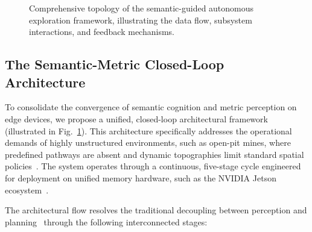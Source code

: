 \documentclass[conference]{IEEEtran}
\begin{document}
\begin{figure}[htbp]
	\caption{Comprehensive topology of the semantic-guided autonomous exploration framework, illustrating the data flow, subsystem interactions, and feedback mechanisms.}
	\label{fig:comprehensive_topology}
\end{figure}

\subsection{The Semantic-Metric Closed-Loop Architecture}
\label{subsec:closed_loop}

To consolidate the convergence of semantic cognition and metric perception on edge devices, we propose a unified, closed-loop architectural framework (illustrated in Fig.~\ref{fig:comprehensive_topology}). This architecture specifically addresses the operational demands of highly unstructured environments, such as open-pit mines, where predefined pathways are absent and dynamic topographies limit standard spatial policies~\cite{wang2022terrain}. The system operates through a continuous, five-stage cycle engineered for deployment on unified memory hardware, such as the NVIDIA Jetson ecosystem~\cite{bvm2024jetson, edge_opt2024}.

The architectural flow resolves the traditional decoupling between perception and planning~\cite{dhami2023prednbv} through the following interconnected stages:
\end{document}
